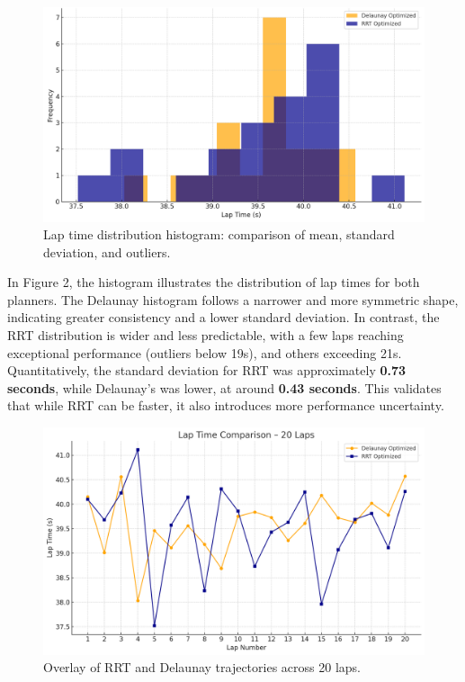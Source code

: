 \documentclass[a4paper,11pt]{report}
\begin{document}
\begin{figure}[H]
    \centering
    \includegraphics[width=0.9\linewidth]{Images/Laptimedistribution.png}
    \caption{Lap time distribution histogram: comparison of mean, standard deviation, and outliers.}
\end{figure}

In Figure 2, the histogram illustrates the distribution of lap times for both planners. The Delaunay histogram follows a narrower and more symmetric shape, indicating greater consistency and a lower standard deviation. In contrast, the RRT distribution is wider and less predictable, with a few laps reaching exceptional performance (outliers below 19s), and others exceeding 21s. Quantitatively, the standard deviation for RRT was approximately \textbf{0.73 seconds}, while Delaunay's was lower, at around \textbf{0.43 seconds}. This validates that while RRT can be faster, it also introduces more performance uncertainty.

\begin{figure}[H]
    \centering
    \includegraphics[width=0.9\linewidth]{Images/RRTvsDELAUNAY.png}
    \caption{Overlay of RRT and Delaunay trajectories across 20 laps.}
\end{figure}
\end{document}
